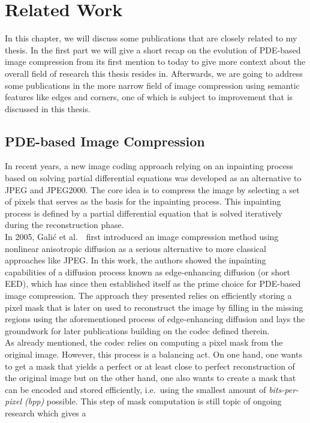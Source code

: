 \chapter{Related Work}\label{ch:RelatedWork}
In this chapter, we will discuss some publications that are closely related to my thesis. 
In the first part we will give a short recap on the evolution of PDE-based image compression from
its first mention to today to give more context about the overall field of research this thesis 
resides in.
Afterwards, we are going to address some publications in the more narrow field of image compression
using semantic features like edges and corners, one of which is subject to improvement that is 
discussed in this thesis.
\section{PDE-based Image Compression}
In recent years, a new image coding approach relying on an inpainting process based on solving partial
differential equations was developed as an alternative to JPEG and JPEG2000. 
The core idea is to compress the image by selecting a set of pixels that serves as the basis for the 
inpainting process. 
This inpainting process is defined by a partial differential equation that is solved iteratively during 
the reconstruction phase.\\
In 2005, Galić et al.~\cite{galic05}\ first introduced an image compression method using nonlinear
anisotropic diffusion as a serious alternative to more classical approaches like JPEG.\@
In this work, the authors showed the inpainting capabilities of a diffusion process known as edge-enhancing
diffusion (or short EED), which has since then established itself as the prime choice for PDE-based image
compression. The approach they presented relies on efficiently storing a pixel mask that is later
on used to reconstruct the image by filling in the missing regions using the aforementioned process
of edge-enhancing diffusion and lays the groundwork for later publications building on the codec
defined therein. \\
As already mentioned, the codec relies on computing a pixel mask from the original image. However,
this process is a balancing act. On one hand, one wants to get a mask that yields a perfect
or at least close to perfect reconstruction of the original image but on the other hand, one 
also wants to create a mask that
can be encoded and stored efficiently, i.e.\ using the smallest amount of \textit{bits-per-pixel
(bpp)} possible. This step of mask computation is still topic of ongoing research which gives a
